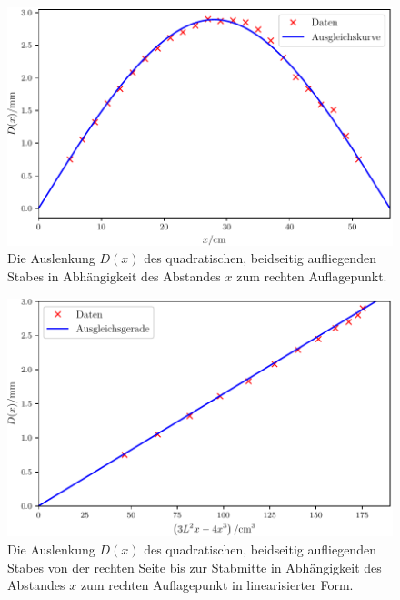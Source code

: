 \begin{figure}
	\centering
	\includegraphics[scale=.8]{content/images/StabQuadratBeidseitig1.pdf}
	\caption{Die Auslenkung $D(x)$ des quadratischen, beidseitig aufliegenden Stabes in Abhängigkeit des Abstandes $x$ zum rechten Auflagepunkt.}
	\label{fig:beidseitig}
\end{figure}
\begin{figure}
	\centering
	\includegraphics[scale=.8]{content/images/StabQuadratBeidseitig2.pdf}
	\caption{Die Auslenkung $D(x)$ des quadratischen, beidseitig aufliegenden Stabes von der rechten Seite bis zur Stabmitte in Abhängigkeit des Abstandes $x$ zum rechten Auflagepunkt in linearisierter Form.}
	\label{fig:beidseitiglinear1}
\end{figure}
